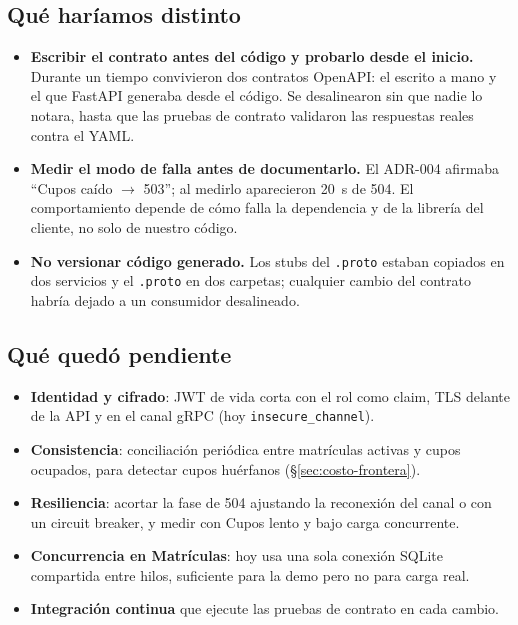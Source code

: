 \documentclass[11pt,spanish]{article}
\begin{document}
\subsection{Qué haríamos distinto}

\begin{itemize}
    \item \textbf{Escribir el contrato antes del código y probarlo desde el inicio.} Durante un tiempo convivieron dos contratos OpenAPI: el escrito a mano y el que FastAPI generaba desde el código. Se desalinearon sin que nadie lo notara, hasta que las pruebas de contrato validaron las respuestas reales contra el YAML.
    \item \textbf{Medir el modo de falla antes de documentarlo.} El ADR-004 afirmaba ``Cupos caído $\to$ 503''; al medirlo aparecieron 20~s de 504. El comportamiento depende de cómo falla la dependencia y de la librería del cliente, no solo de nuestro código.
    \item \textbf{No versionar código generado.} Los stubs del \texttt{.proto} estaban copiados en dos servicios y el \texttt{.proto} en dos carpetas; cualquier cambio del contrato habría dejado a un consumidor desalineado.
\end{itemize}

\subsection{Qué quedó pendiente}\label{sec:pendiente}

\begin{itemize}
    \item \textbf{Identidad y cifrado}: JWT de vida corta con el rol como claim, TLS delante de la API y en el canal gRPC (hoy \texttt{insecure\_channel}).
    \item \textbf{Consistencia}: conciliación periódica entre matrículas activas y cupos ocupados, para detectar cupos huérfanos (\S\ref{sec:costo-frontera}).
    \item \textbf{Resiliencia}: acortar la fase de 504 ajustando la reconexión del canal o con un circuit breaker, y medir con Cupos lento y bajo carga concurrente.
    \item \textbf{Concurrencia en Matrículas}: hoy usa una sola conexión SQLite compartida entre hilos, suficiente para la demo pero no para carga real.
    \item \textbf{Integración continua} que ejecute las pruebas de contrato en cada cambio.
\end{itemize}
\end{document}
